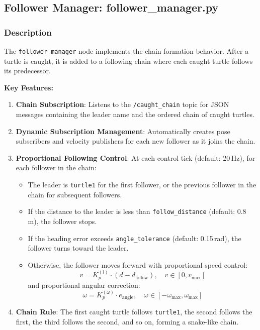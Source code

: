 \documentclass[12pt,a4paper]{article}
\begin{document}
\subsection{Follower Manager: follower\_manager.py}
\label{subsec:follower}

\subsubsection{Description}

The \texttt{follower\_manager} node implements the chain formation behavior. After a turtle is caught, it is added to a following chain where each caught turtle follows its predecessor.

\textbf{Key Features:}

\begin{enumerate}[label=\arabic*.]
  \item \textbf{Chain Subscription}: Listens to the \texttt{/caught\_chain} topic for JSON messages containing the leader name and the ordered chain of caught turtles.

  \item \textbf{Dynamic Subscription Management}: Automatically creates pose subscribers and velocity publishers for each new follower as it joins the chain.

  \item \textbf{Proportional Following Control}: At each control tick (default: 20\,Hz), for each follower in the chain:
  \begin{itemize}
    \item The leader is \texttt{turtle1} for the first follower, or the previous follower in the chain for subsequent followers.
    \item If the distance to the leader is less than \texttt{follow\_distance} (default: 0.8\,m), the follower stops.
    \item If the heading error exceeds \texttt{angle\_tolerance} (default: 0.15\,rad), the follower turns toward the leader.
    \item Otherwise, the follower moves forward with proportional speed control:
    \[
      v = K_p^{(l)} \cdot (d - d_{\text{follow}}), \quad v \in [0, v_{\max}]
    \]
    and proportional angular correction:
    \[
      \omega = K_p^{(\omega)} \cdot e_{\text{angle}}, \quad \omega \in [-\omega_{\max}, \omega_{\max}]
    \]
  \end{itemize}

  \item \textbf{Chain Rule}: The first caught turtle follows \texttt{turtle1}, the second follows the first, the third follows the second, and so on, forming a snake-like chain.
\end{enumerate}
\end{document}
